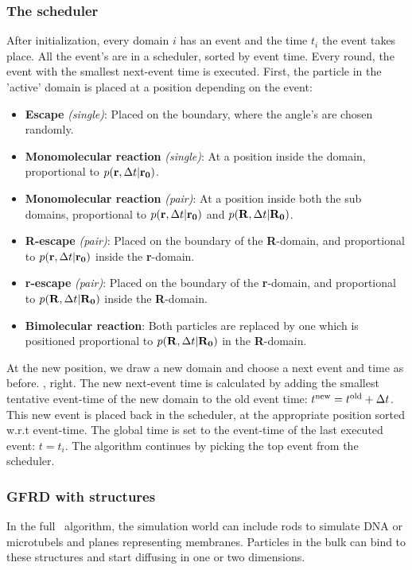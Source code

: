 \subsubsection{The scheduler}
After initialization, every domain $i$ has an event and the time $t_i$ the event takes place. All the event's are in a scheduler, sorted by event time. Every round, the event with the smallest next-event time is executed. First, the particle in the 'active' domain is placed at a position depending on the event: 
\begin{itemize}
 \item {\bf Escape} {\it (single)}: Placed on the boundary, where the angle's are chosen randomly.
 \item {\bf Monomolecular reaction} {\it (single)}: At a position inside the domain, proportional to $p({\bf r},\Delta t|{\bf r_0})$.
 \item {\bf Monomolecular reaction} {\it (pair)}: At a position inside both the sub domains, proportional to $p({\bf r},\Delta t|{\bf r_0})$ and $p({\bf R},\Delta t|{\bf R_0})$.
 \item {\bf R-escape} {\it (pair)}: Placed on the boundary of the {\bf R}-domain, and proportional to $p({\bf r},\Delta t|{\bf r_0})$ inside the {\bf r}-domain.
 \item {\bf r-escape} {\it (pair)}: Placed on the boundary of the {\bf r}-domain, and proportional to $p({\bf R},\Delta t|{\bf R_0})$ inside the {\bf R}-domain. 
 \item {\bf Bimolecular reaction}: Both particles are replaced by one which is positioned proportional to $p({\bf R},\Delta t|{\bf R_0})$ in the {\bf R}-domain.
\end{itemize}
At the new position, we draw a new domain and choose a next event and time as before. , right. The new next-event time is calculated by adding the smallest tentative event-time of the new domain to the old event time: $t^{\rm new} =  t^{\rm old} + \Delta t$. This new event is placed back in the scheduler, at the appropriate position sorted w.r.t event-time. The global time is set to the event-time of the last executed event: $t=t_i$. The algorithm continues by picking the top event from the scheduler.

\subsubsection{GFRD with structures}
In the full \GFRD\ algorithm, the simulation world can include rods to simulate DNA or microtubels and planes representing membranes. Particles in the bulk can bind to these structures and start diffusing in one or two dimensions.










